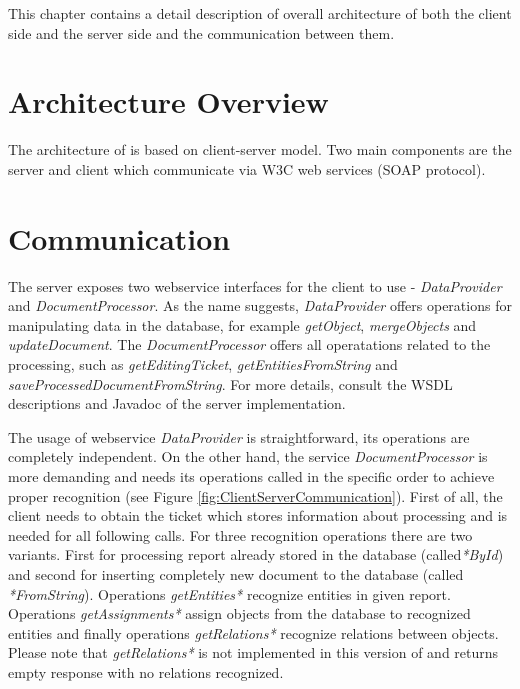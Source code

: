 
This chapter contains a detail description of overall architecture of both the client
side and the server side and the communication between them. 

\section{Architecture Overview}

The architecture of \textan{} is based on client-server model. Two main components
are the \textan{} server and \textan{} client which communicate via W3C web services
(SOAP protocol).


\section{Communication}
\label{sec:Communication}

The \textan{} server exposes two webservice interfaces for the client to use -
\emph{DataProvider} and \emph{DocumentProcessor}. As the name suggests,
\emph{DataProvider} offers operations for manipulating data in the database,
for example \emph{getObject}, \emph{mergeObjects} and \emph{updateDocument}.
The \emph{DocumentProcessor} offers all operatations related to the processing,
such as \emph{getEditingTicket}, \emph{getEntitiesFromString} and
\emph{saveProcessedDocumentFromString}.
For more details, consult the WSDL descriptions and Javadoc of the server
implementation.

The usage of webservice \emph{DataProvider} is straightforward, its operations
are completely independent. On the other hand, the service
\emph{DocumentProcessor} is more demanding and needs its operations
called in the specific order to achieve proper recognition (see Figure
\ref{fig:ClientServerCommunication}). First of all, the client needs to obtain
the ticket which stores information about processing and is needed for all
following calls. For three recognition operations there are two variants. First
for processing report already stored in the database (called\emph{*ById}) and
second for inserting completely new document to the database (called
\emph{*FromString}). Operations \emph{getEntities*} recognize entities in
given report. Operations \emph{getAssignments*} assign objects from the database
to recognized entities and finally operations \emph{getRelations*} recognize
relations between objects. Please note that \emph{getRelations*} is not
implemented in this version of \textan{} and returns empty response with no
relations recognized.


